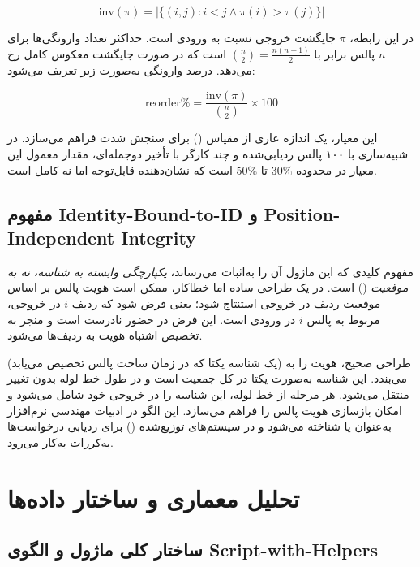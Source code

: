 \begin{equation}
	\text{inv}(\pi) = \left| \{(i, j) : i < j \land \pi(i) > \pi(j)\} \right|
\end{equation}

در این رابطه، $\pi$ جایگشت خروجی نسبت به ورودی است. حداکثر تعداد وارونگی‌ها برای $n$ پالس برابر با $\binom{n}{2} = \frac{n(n-1)}{2}$ است که در صورت جایگشت معکوس کامل رخ می‌دهد. درصد وارونگی به‌صورت زیر تعریف می‌شود:

\begin{equation}
	\text{reorder\%} = \frac{\text{inv}(\pi)}{\binom{n}{2}} \times 100
\end{equation}

این معیار، یک اندازه عاری از مقیاس () برای سنجش شدت  فراهم می‌سازد. در شبیه‌سازی با ۱۰۰ پالس ردیابی‌شده و چند کارگر با تأخیر دوجمله‌ای، مقدار معمول این معیار در محدوده $30\%$ تا $50\%$ است که نشان‌دهنده  قابل‌توجه اما نه کامل است.

\subsection{مفهوم Identity-Bound-to-ID و Position-Independent Integrity}

مفهوم کلیدی که این ماژول آن را به‌اثبات می‌رساند، \emph{یکپارچگی وابسته به شناسه، نه به موقعیت} () است. در یک طراحی ساده اما خطاکار، ممکن است هویت پالس بر اساس موقعیت ردیف در خروجی استنتاج شود؛ یعنی فرض شود که ردیف $i$ در خروجی، مربوط به پالس $i$ در ورودی است. این فرض در حضور  نادرست است و منجر به تخصیص اشتباه هویت به ردیف‌ها می‌شود.

طراحی صحیح، هویت را به  (یک شناسه یکتا که در زمان ساخت پالس تخصیص می‌یابد) می‌بندد. این شناسه به‌صورت یکتا در کل جمعیت است و در طول خط لوله بدون تغییر منتقل می‌شود. هر مرحله از خط لوله، این شناسه را در خروجی خود شامل می‌شود و امکان بازسازی هویت پالس را فراهم می‌سازد. این الگو در ادبیات مهندسی نرم‌افزار به‌عنوان  یا  شناخته می‌شود و در سیستم‌های توزیع‌شده () برای ردیابی درخواست‌ها به‌کررات به‌کار می‌رود.

\section{تحلیل معماری و ساختار داده‌ها}

\subsection{ساختار کلی ماژول و الگوی Script-with-Helpers}

